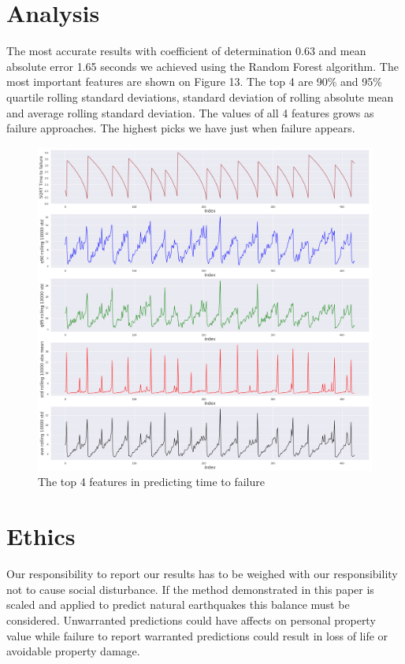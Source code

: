 \documentclass[]{llncs} %
\begin{document}
\section{Analysis}
The most accurate results with coefficient of determination 0.63 and mean absolute error 1.65 seconds we achieved using the Random Forest algorithm. The most important features are shown on Figure 13. The top 4 are 90\% and 95\% quartile rolling standard deviations, standard deviation of rolling absolute mean and average rolling standard deviation.
The values of all 4 features grows as failure approaches. The highest picks we have just when failure appears.
\begin{figure}[H]
	\centering
	\includegraphics[width=1\linewidth]{analysis}
	\caption{The top 4 features in predicting time to failure}
	\label{fig:analysis}
\end{figure}

\clearpage
\newpage

\section{Ethics}

Our responsibility to report our results has to be weighed with our responsibility not to cause social disturbance. If the method demonstrated in this paper is scaled and applied to predict natural earthquakes this balance must be considered. Unwarranted predictions could have affects on personal property value while failure to report warranted predictions could result in loss of life or avoidable property damage. \par
\end{document}
